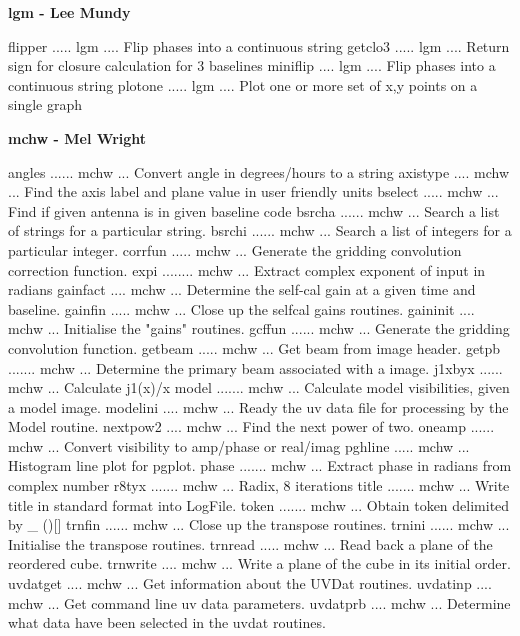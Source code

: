 \par\centerline {\bf lgm - Lee Mundy}
{\eightpoint\begintt
flipper ..... lgm .... Flip phases into a continuous string 
getclo3 ..... lgm .... Return sign for closure calculation for 3 baselines 
miniflip .... lgm .... Flip phases into a continuous string 
plotone ..... lgm .... Plot one or more set of x,y points on a single graph 
\endtt}
\par\centerline {\bf mchw - Mel Wright}
{\eightpoint\begintt
angles ...... mchw ... Convert angle in degrees/hours to a string 
axistype .... mchw ... Find the axis label and plane value in user friendly units 
bselect ..... mchw ... Find if given antenna is in given baseline code 
bsrcha ...... mchw ... Search a list of strings for a particular string. 
bsrchi ...... mchw ... Search a list of integers for a particular integer. 
\endtt}
{\eightpoint\begintt
corrfun ..... mchw ... Generate the gridding convolution correction function. 
expi ........ mchw ... Extract complex exponent of input in radians 
gainfact .... mchw ... Determine the self-cal gain at a given time and baseline.
gainfin ..... mchw ... Close up the selfcal gains routines. 
gaininit .... mchw ... Initialise the "gains" routines. 
\endtt}
{\eightpoint\begintt
gcffun ...... mchw ... Generate the gridding convolution function. 
getbeam ..... mchw ... Get beam from image header. 
getpb ....... mchw ... Determine the primary beam associated with a image. 
j1xbyx ...... mchw ... Calculate j1(x)/x 
model ....... mchw ... Calculate model visibilities, given a model image. 
\endtt}
{\eightpoint\begintt
modelini .... mchw ... Ready the uv data file for processing by the Model routine. 
nextpow2 .... mchw ... Find the next power of two. 
oneamp ...... mchw ... Convert visibility to amp/phase or real/imag 
pghline ..... mchw ... Histogram line plot for pgplot. 
phase ....... mchw ... Extract phase in radians from complex number 
\endtt}
{\eightpoint\begintt
r8tyx ....... mchw ... Radix, 8 iterations 
title ....... mchw ... Write title in standard format into LogFile. 
token ....... mchw ... Obtain token delimited by _ ()[] 
trnfin ...... mchw ... Close up the transpose routines. 
trnini ...... mchw ... Initialise the transpose routines. 
\endtt}
{\eightpoint\begintt
trnread ..... mchw ... Read back a plane of the reordered cube. 
trnwrite .... mchw ... Write a plane of the cube in its initial order. 
uvdatget .... mchw ... Get information about the UVDat routines. 
uvdatinp .... mchw ... Get command line uv data parameters. 
uvdatprb .... mchw ... Determine what data have been selected in the uvdat routines. 
\endtt}
